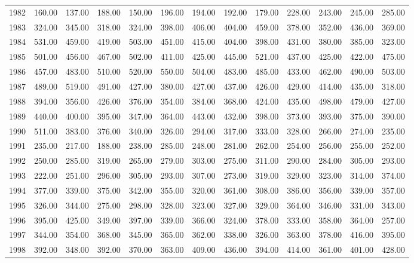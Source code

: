 \begin{longtable}{rrrrrrrrrrrrr}
  1982 & 160.00 & 137.00 & 188.00 & 150.00 & 196.00 & 194.00 & 192.00 & 179.00 & 228.00 & 243.00 & 245.00 & 285.00 \\ 
  1983 & 324.00 & 345.00 & 318.00 & 324.00 & 398.00 & 406.00 & 404.00 & 459.00 & 378.00 & 352.00 & 436.00 & 369.00 \\ 
  1984 & 531.00 & 459.00 & 419.00 & 503.00 & 451.00 & 415.00 & 404.00 & 398.00 & 431.00 & 380.00 & 385.00 & 323.00 \\ 
  1985 & 501.00 & 456.00 & 467.00 & 502.00 & 411.00 & 425.00 & 445.00 & 521.00 & 437.00 & 425.00 & 422.00 & 475.00 \\ 
  1986 & 457.00 & 483.00 & 510.00 & 520.00 & 550.00 & 504.00 & 483.00 & 485.00 & 433.00 & 462.00 & 490.00 & 503.00 \\ 
  1987 & 489.00 & 519.00 & 491.00 & 427.00 & 380.00 & 427.00 & 437.00 & 426.00 & 429.00 & 414.00 & 435.00 & 318.00 \\ 
  1988 & 394.00 & 356.00 & 426.00 & 376.00 & 354.00 & 384.00 & 368.00 & 424.00 & 435.00 & 498.00 & 479.00 & 427.00 \\ 
  1989 & 440.00 & 400.00 & 395.00 & 347.00 & 364.00 & 443.00 & 432.00 & 398.00 & 373.00 & 393.00 & 375.00 & 390.00 \\ 
  1990 & 511.00 & 383.00 & 376.00 & 340.00 & 326.00 & 294.00 & 317.00 & 333.00 & 328.00 & 266.00 & 274.00 & 235.00 \\ 
  1991 & 235.00 & 217.00 & 188.00 & 238.00 & 285.00 & 248.00 & 281.00 & 262.00 & 254.00 & 256.00 & 255.00 & 252.00 \\ 
  1992 & 250.00 & 285.00 & 319.00 & 265.00 & 279.00 & 303.00 & 275.00 & 311.00 & 290.00 & 284.00 & 305.00 & 293.00 \\ 
  1993 & 222.00 & 251.00 & 296.00 & 305.00 & 293.00 & 307.00 & 273.00 & 319.00 & 329.00 & 323.00 & 314.00 & 374.00 \\ 
  1994 & 377.00 & 339.00 & 375.00 & 342.00 & 355.00 & 320.00 & 361.00 & 308.00 & 386.00 & 356.00 & 339.00 & 357.00 \\ 
  1995 & 326.00 & 344.00 & 275.00 & 298.00 & 328.00 & 323.00 & 327.00 & 329.00 & 364.00 & 346.00 & 331.00 & 343.00 \\ 
  1996 & 395.00 & 425.00 & 349.00 & 397.00 & 339.00 & 366.00 & 324.00 & 378.00 & 333.00 & 358.00 & 364.00 & 257.00 \\ 
  1997 & 344.00 & 354.00 & 368.00 & 345.00 & 365.00 & 362.00 & 338.00 & 326.00 & 363.00 & 378.00 & 416.00 & 395.00 \\ 
  1998 & 392.00 & 348.00 & 392.00 & 370.00 & 363.00 & 409.00 & 436.00 & 394.00 & 414.00 & 361.00 & 401.00 & 428.00 \\ 

\end{longtable}
